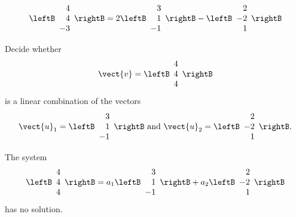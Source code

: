 \begin{enumialphparenastyle}
\begin{ex}
\begin{sol}
\begin{equation*}
\leftB
\begin{array}{r}
4 \\
4 \\
-3
\end{array}
\rightB
=
2
\leftB
\begin{array}{r}
3 \\
1 \\
-1
\end{array}
\rightB
-
\leftB
\begin{array}{r}
2 \\
-2\\
1
\end{array}
\rightB
\end{equation*}
\end{sol}
\end{ex}


\begin{ex}
Decide whether 
\begin{equation*}
\vect{v}= \leftB
\begin{array}{r}
4 \\
4 \\
4
\end{array}
\rightB
\end{equation*}
is a linear combination of the vectors 
\begin{equation*}
\vect{u}_1 = \leftB
\begin{array}{r}
3 \\
1 \\
-1
\end{array}
\rightB
\mbox{ and } 
\vect{u}_2 = 
\leftB
\begin{array}{r}
2 \\
-2\\
1
\end{array}
\rightB.
\end{equation*}

\begin{sol}
The system 
\begin{equation*}
\leftB
\begin{array}{r}
4 \\
4 \\
4
\end{array}
\rightB
=
a_1
\leftB
\begin{array}{r}
3 \\
1 \\
-1
\end{array}
\rightB
+a_2
\leftB
\begin{array}{r}
2 \\
-2\\
1
\end{array}
\rightB
\end{equation*}
has no solution.
\end{sol}
\end{ex}

\end{enumialphparenastyle}